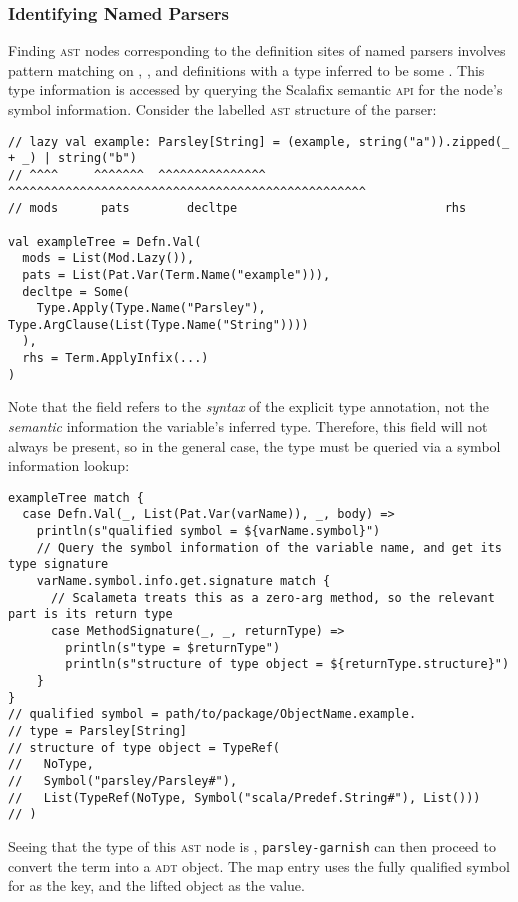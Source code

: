 \documentclass[../../main.tex]{subfiles}
\begin{document}
\subsubsection{Identifying Named Parsers}
Finding \textsc{ast} nodes corresponding to the definition sites of named parsers involves pattern matching on , , and  definitions with a type inferred to be some .
This type information is accessed by querying the Scalafix semantic \textsc{api} for the node's symbol information.
Consider the labelled \textsc{ast} structure of the  parser:
\begin{verbatim}
// lazy val example: Parsley[String] = (example, string("a")).zipped(_ + _) | string("b")
// ^^^^     ^^^^^^^  ^^^^^^^^^^^^^^^   ^^^^^^^^^^^^^^^^^^^^^^^^^^^^^^^^^^^^^^^^^^^^^^^^^^
// mods      pats        decltpe                             rhs

val exampleTree = Defn.Val(
  mods = List(Mod.Lazy()),
  pats = List(Pat.Var(Term.Name("example"))),
  decltpe = Some(
    Type.Apply(Type.Name("Parsley"), Type.ArgClause(List(Type.Name("String"))))
  ),
  rhs = Term.ApplyInfix(...)
)
\end{verbatim}
%
Note that the \scala{decltpe} field refers to the \emph{syntax} of the explicit type annotation, not the \emph{semantic} information the variable's inferred type.
Therefore, this field will not always be present, so in the general case, the type must be queried via a symbol information lookup:
\begin{verbatim}
exampleTree match {
  case Defn.Val(_, List(Pat.Var(varName)), _, body) =>
    println(s"qualified symbol = ${varName.symbol}")
    // Query the symbol information of the variable name, and get its type signature
    varName.symbol.info.get.signature match {
      // Scalameta treats this as a zero-arg method, so the relevant part is its return type
      case MethodSignature(_, _, returnType) =>
        println(s"type = $returnType")
        println(s"structure of type object = ${returnType.structure}")
    }
}
// qualified symbol = path/to/package/ObjectName.example.
// type = Parsley[String]
// structure of type object = TypeRef(
//   NoType,
//   Symbol("parsley/Parsley#"),
//   List(TypeRef(NoType, Symbol("scala/Predef.String#"), List()))
// )
\end{verbatim}
Seeing that the type of this \textsc{ast} node is , \texttt{parsley-garnish} can then proceed to convert the  term into a  \textsc{adt} object.
The map entry uses the fully qualified symbol for \scala{example} as the key, and the lifted \scala{Parser} object as the value.
\end{document}
